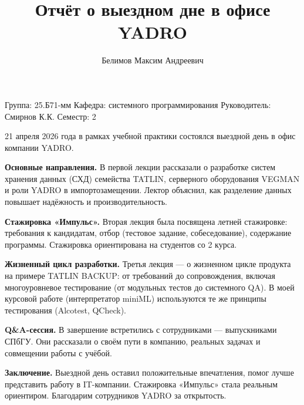 \documentclass[a4paper]{article}
\title{Отчёт о выездном дне в офисе YADRO}
\author{Белимов Максим Андреевич}
\date{}
\begin{document}
\maketitle

Группа: 25.Б71-мм \hfill Кафедра: системного программирования \hfill Руководитель: Смирнов К.К. \hfill Семестр: 2

\vspace{0.2cm}

21 апреля 2026 года в рамках учебной практики состоялся выездной день в офис компании YADRO.

\textbf{Основные направления.} В первой лекции рассказали о разработке систем хранения данных (СХД) семейства TATLIN, серверного оборудования VEGMAN и роли YADRO в импортозамещении. Лектор объяснил, как разделение данных повышает надёжность и производительность.

\textbf{Стажировка «Импульс».} Вторая лекция была посвящена летней стажировке: требования к кандидатам, отбор (тестовое задание, собеседование), содержание программы. Стажировка ориентирована на студентов со 2 курса.

\textbf{Жизненный цикл разработки.} Третья лекция — о жизненном цикле продукта на примере TATLIN BACKUP: от требований до сопровождения, включая многоуровневое тестирование (от модульных тестов до системного QA). В моей курсовой работе (интерпретатор miniML) используются те же принципы тестирования (Alcotest, QCheck).

\textbf{Q\&A-сессия.} В завершение встретились с сотрудниками — выпускниками СПбГУ. Они рассказали о своём пути в компанию, реальных задачах и совмещении работы с учёбой.

\textbf{Заключение.} Выездной день оставил положительные впечатления, помог лучше представить работу в IT-компании. Стажировка «Импульс» стала реальным ориентиром. Благодарим сотрудников YADRO за открытость.
\end{document}
